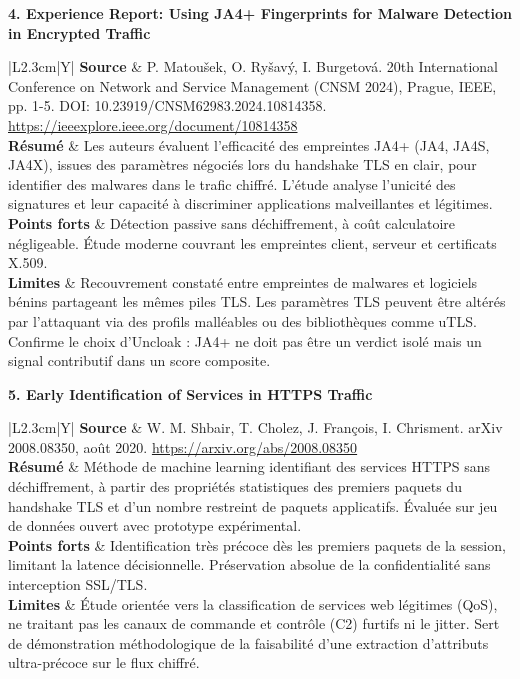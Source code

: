 \documentclass[10pt,a4paper]{article}
\newcommand{\articlecard}[5]{
    \noindent\textbf{#1}\par\vspace{1.2mm}
    \noindent\begin{tabularx}{\textwidth}{|L{2.3cm}|Y|}
        \hline
        \textbf{Source} & #2 \\ \hline
        \textbf{Résumé} & #3 \\ \hline
        \textbf{Points forts} & #4 \\ \hline
        \textbf{Limites} & #5 \\ \hline
    \end{tabularx}
    \vspace{3.5mm}
}
\begin{document}
\articlecard{4. Experience Report: Using JA4+ Fingerprints for Malware Detection in Encrypted Traffic}{
P. Matoušek, O. Ryšavý, I. Burgetová. 20th International Conference on Network and Service Management (CNSM 2024), Prague, IEEE, pp. 1-5. DOI: 10.23919/CNSM62983.2024.10814358.\newline
\url{https://ieeexplore.ieee.org/document/10814358}
}{
Les auteurs évaluent l'efficacité des empreintes JA4+ (JA4, JA4S, JA4X), issues des paramètres négociés lors du handshake TLS en clair, pour identifier des malwares dans le trafic chiffré. L'étude analyse l'unicité des signatures et leur capacité à discriminer applications malveillantes et légitimes.
}{
Détection passive sans déchiffrement, à coût calculatoire négligeable. Étude moderne couvrant les empreintes client, serveur et certificats X.509.
}{
Recouvrement constaté entre empreintes de malwares et logiciels bénins partageant les mêmes piles TLS. Les paramètres TLS peuvent être altérés par l'attaquant via des profils malléables ou des bibliothèques comme uTLS. Confirme le choix d'Uncloak : JA4+ ne doit pas être un verdict isolé mais un signal contributif dans un score composite.
}

\articlecard{5. Early Identification of Services in HTTPS Traffic}{
W. M. Shbair, T. Cholez, J. François, I. Chrisment. arXiv 2008.08350, août 2020.\newline
\url{https://arxiv.org/abs/2008.08350}
}{
Méthode de machine learning identifiant des services HTTPS sans déchiffrement, à partir des propriétés statistiques des premiers paquets du handshake TLS et d'un nombre restreint de paquets applicatifs. Évaluée sur jeu de données ouvert avec prototype expérimental.
}{
Identification très précoce dès les premiers paquets de la session, limitant la latence décisionnelle. Préservation absolue de la confidentialité sans interception SSL/TLS.
}{
Étude orientée vers la classification de services web légitimes (QoS), ne traitant pas les canaux de commande et contrôle (C2) furtifs ni le jitter. Sert de démonstration méthodologique de la faisabilité d'une extraction d'attributs ultra-précoce sur le flux chiffré.
}

\newpage
\end{document}
